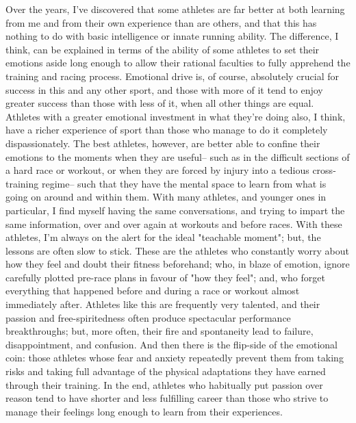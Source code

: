 Over the years, I've discovered that some athletes are far better at both learning from me and from their own experience than are others, and that this has nothing to do with basic intelligence or innate running ability. The difference, I think, can be explained in terms of the ability of some athletes to set their emotions aside long enough to allow their rational faculties to fully apprehend the training and racing process. Emotional drive is, of course, absolutely crucial for success in this and any other sport, and those with more of it tend to enjoy greater success than those with less of it, when all other things are equal. Athletes with a greater emotional investment in what they're doing also, I think, have a richer experience of sport than those who manage to do it completely dispassionately. The best athletes, however, are better able to confine their emotions to the moments when they are useful-- such as in the difficult sections of a hard race or workout, or when they are forced by injury into a tedious cross-training regime-- such that they have the mental space to learn from what is going on around and within them. With many athletes, and younger ones in particular, I find myself having the same conversations, and trying to impart the same information, over and over again at workouts and before races. With these athletes, I'm always on the alert for the ideal "teachable moment"; but, the lessons are often slow to stick. These are the athletes who constantly worry about how they feel and doubt their fitness beforehand; who, in blaze of emotion, ignore carefully plotted pre-race plans in favour of "how they feel"; and, who forget everything that happened before and during a race or workout almost immediately after. Athletes like this are frequently very talented, and their passion and free-spiritedness often produce spectacular performance breakthroughs; but, more often, their fire and spontaneity lead to failure, disappointment, and confusion. And then there is the flip-side of the emotional coin: those athletes whose fear and anxiety repeatedly prevent them from taking risks and taking full advantage of the physical adaptations they have earned through their training. In the end, athletes who habitually put passion over reason tend to have shorter and less fulfilling career than those who strive to manage their feelings long enough to learn from their experiences.

